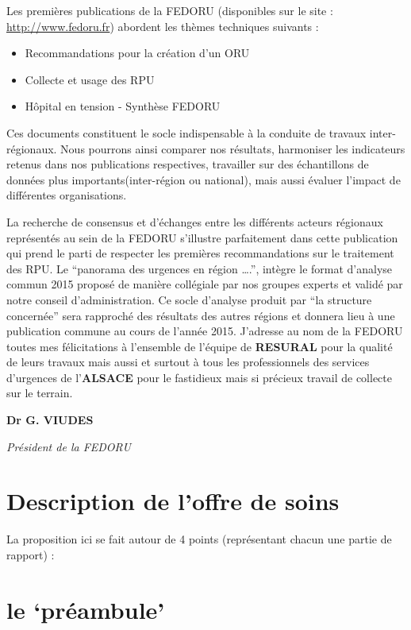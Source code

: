 \documentclass[]{article}
\begin{document}
Les premières publications de la FEDORU (disponibles sur le site :
\url{http://www.fedoru.fr}) abordent les thèmes techniques suivants :

\begin{itemize}
\itemsep1pt\parskip0pt
\item
  Recommandations pour la création d'un ORU
\item
  Collecte et usage des RPU
\item
  Hôpital en tension - Synthèse FEDORU
\end{itemize}

Ces documents constituent le socle indispensable à la conduite de
travaux inter-régionaux. Nous pourrons ainsi comparer nos résultats,
harmoniser les indicateurs retenus dans nos publications respectives,
travailler sur des échantillons de données plus importants(inter-région
ou national), mais aussi évaluer l'impact de différentes organisations.

La recherche de consensus et d'échanges entre les différents acteurs
régionaux représentés au sein de la FEDORU s'illustre parfaitement dans
cette publication qui prend le parti de respecter les premières
recommandations sur le traitement des RPU. Le ``panorama des urgences en
région \ldots{}.'', intègre le format d'analyse commun 2015 proposé de
manière collégiale par nos groupes experts et validé par notre conseil
d'administration. Ce socle d'analyse produit par ``la structure
concernée'' sera rapproché des résultats des autres régions et donnera
lieu à une publication commune au cours de l'année 2015. J'adresse au
nom de la FEDORU toutes mes félicitations à l'ensemble de l'équipe de
\textbf{RESURAL} pour la qualité de leurs travaux mais aussi et surtout
à tous les professionnels des services d'urgences de l'\textbf{ALSACE}
pour le fastidieux mais si précieux travail de collecte sur le terrain.

\textbf{Dr G. VIUDES}

\emph{Président de la FEDORU}

\section{Description de l'offre de
soins}\label{description-de-loffre-de-soins}

La proposition ici se fait autour de 4 points (représentant chacun une
partie de rapport) :

\section{le `préambule'}\label{le-preambule}
\end{document}
